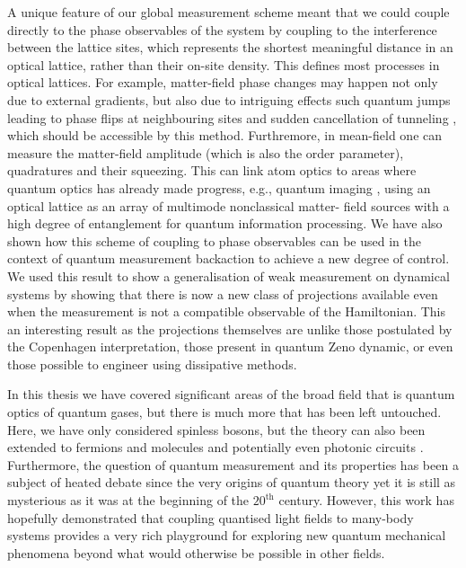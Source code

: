 A unique feature of our global measurement scheme meant that we could
couple directly to the phase observables of the system by coupling to
the interference between the lattice sites, which represents the
shortest meaningful distance in an optical lattice, rather than their
on-site density. This defines most processes in optical lattices.  For
example, matter-field phase changes may happen not only due to
external gradients, but also due to intriguing effects such quantum
jumps leading to phase flips at neighbouring sites and sudden
cancellation of tunneling \cite{vukics2007}, which should be
accessible by this method. Furthremore, in mean-field one can measure
the matter-field amplitude (which is also the order parameter),
quadratures and their squeezing. This can link atom optics to areas
where quantum optics has already made progress, e.g., quantum imaging
\cite{golubev2010, kolobov1999}, using an optical lattice as an array
of multimode nonclassical matter- field sources with a high degree of
entanglement for quantum information processing. We have also shown
how this scheme of coupling to phase observables can be used in the
context of quantum measurement backaction to achieve a new degree of
control. We used this result to show a generalisation of weak
measurement on dynamical systems by showing that there is now a new
class of projections available even when the measurement is not a
compatible observable of the Hamiltonian. This an interesting result
as the projections themselves are unlike those postulated by the
Copenhagen interpretation, those present in quantum Zeno dynamic, or
even those possible to engineer using dissipative methods.

In this thesis we have covered significant areas of the broad field
that is quantum optics of quantum gases, but there is much more that
has been left untouched. Here, we have only considered spinless
bosons, but the theory can also been extended to fermions
\cite{atoms2015, mazzucchi2016, mazzucchi2016af} and
molecules \cite{LP2013} and potentially even photonic circuits
\cite{mazzucchi2016njp}. Furthermore, the question of quantum
measurement and its properties has been a subject of heated debate
since the very origins of quantum theory yet it is still as mysterious
as it was at the beginning of the $20^\mathrm{th}$ century. However,
this work has hopefully demonstrated that coupling quantised light
fields to many-body systems provides a very rich playground for
exploring new quantum mechanical phenomena beyond what would otherwise
be possible in other fields.
